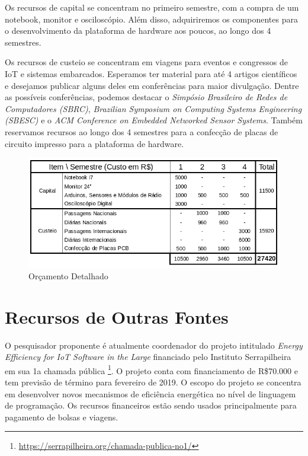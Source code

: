 \documentclass[titlepage,12pt]{article}
\begin{document}
Os recursos de capital se concentram no primeiro semestre, com a compra de um
notebook, monitor e osciloscópio.
Além disso, adquiriremos os componentes para o desenvolvimento da plataforma de
hardware aos poucos, ao longo dos 4 semestres.

Os recursos de custeio se concentram em viagens para eventos e congressos de
IoT e sistemas embarcados.
Esperamos ter material para até 4 artigos científicos e desejamos publicar
alguns deles em conferências para maior divulgação.
Dentre as possíveis conferências, podemos destacar o \emph{Simpósio Brasileiro
de Redes de Computadores (SBRC)}, \emph{Brazilian Symposium on Computing
Systems Engineering (SBESC)} e o \emph{ACM Conference on Embedded Networked
Sensor Systems}.
Também reservamos recursos ao longo dos 4 semestres para a confecção de placas
de circuito impresso para a plataforma de hardware.

\begin{figure}[t]
\includegraphics[width=\textwidth]{orcamento}
\caption{ Orçamento Detalhado \label{fig.orcamento} }
\end{figure}


\section{ Recursos de Outras Fontes }

O pesquisador proponente é atualmente coordenador do projeto intitulado
\emph{Energy Efficiency for IoT Software in the Large} financiado pelo
Instituto Serrapilheira em sua 1a chamada pública%
\footnote{\url{https://serrapilheira.org/chamada-publica-no1/}}.
%
O projeto conta com financiamento de R\$70.000 e tem previsão de término para
fevereiro de 2019.
%
O escopo do projeto se concentra em desenvolver novos mecanismos de eficiência
energética no nível de linguagem de programação.
%
Os recursos financeiros estão sendo usados principalmente para pagamento de
bolsas e viagens.
\end{document}

